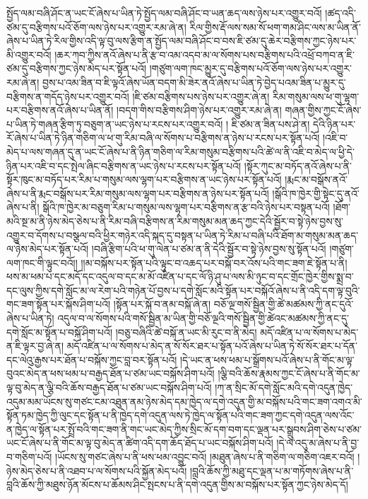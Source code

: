སྤྱོད་ལམ་བཞི་ཤོང་ན་ཡང་ངོ་ཞེས་པ་ཡིན་ཏེ་སྤྱོད་ལམ་བཞི་ཤོང་བ་ཡན་ཆད་ལས་ཉེས་པར་འགྱུར་བའོ། །ཚད་འདི་ཙམ་དུ་བརྩིགས་པའོ་ཅོག་ལས་ཉེས་པར་འགྱུར་རམ་ཞེ་ན། རིལ་གྱིས་རྡོ་ལས་སམ་སོ་ཕག་གམ་ཤིང་ལས་མ་ཡིན་ནོ་ཞེས་པ་ཡིན་ཏེ་རིལ་གྱིས་འདི་ལྟ་བུ་ལས་རྩིག་ན་སྤྱོད་ལམ་བཞི་ཤོང་བ་བས་ཇི་ཙམ་དུ་ཆེར་བརྩིགས་ཀྱང་ཉེས་པར་མི་འགྱུར་བའོ། །ཆར་ཀབ་ཀྱིས་ནའོ་ཞེས་པ་ནི་རྩ་བ་འམ་འདབ་མ་ལ་སོགས་པས་བརྩིགས་པའི་འཕྲོ་བཀབ་ན་ཇི་ཙམ་དུ་བརྩིགས་ཀྱང་ཉེས་མེད་པར་སྟོན་པའོ། །གཙུག་ལག་ཁང་མྱུར་དུ་བརྩིགས་པའོ་ཅོག་ལས་ཉེས་པར་འགྱུར་རམ་ཞེ་ན། བྱས་པ་འམ་ཟིན་བ་ཇི་ལྟའོ་ཞེས་ཡོན་བདག་མི་ཟེར་ནའོ་ཞེས་པ་ཡིན་ཏེ་བྱེད་པའམ་ཟིན་པ་མྱུར་དུ་བརྩིགས་ན་གདོད་ཉེས་པར་འགྱུར་བའོ། །ཇི་ཙམ་བརྩིགས་པས་ཉེས་པར་འགྱུར་ཞེ་ན། རིམ་གསུམ་ལས་ཕ་གུ་ལྷག་པར་བརྩིགས་ནའོ་ཞེས་པ་ཡིན་ནོ། །བདག་གིས་བརྩིགས་ཤིག་ཉེས་པར་འགྱུར་རམ་ཞེ་ན། གཞན་གྱིས་ཀྱང་ངོ་ཞེས་པ་ཡིན་ཏེ་གཞན་རྩིག་ཏུ་བཅུག་ན་ཡང་ཉེས་པ་རངས་པར་འགྱུར་བའོ། །
ཇི་ཙམ་ན་ཟིན་པས་ཤེ་ན། དེའི་ཉིན་པར་རོ་ཞེས་པ་ཡིན་ཏེ་ཉིན་གཅིག་ལ་ཕ་གུ་རིམ་བཞི་ལ་སོགས་པ་བརྩིགས་ན་ཉེས་པ་རངས་པར་སྟོན་པའོ། །འཇི་བ་མེད་པ་ལས་གཞན་དུ་ན་ཡང་ངོ་ཞེས་པ་ནི་ཉིན་གཅིག་ལ་རིམ་གསུམ་བརྩིགས་པའི་ཚེ་ལ་ནི་འཇི་བ་མེད་ལ་ཕྱི་དེ་ཉིན་པར་འཇི་བ་དང་སྤེལ་ཞིང་བརྩིགས་ན་ཡང་ཉེས་པ་རངས་པར་སྟོན་པའོ། །སྟོར་ཀུང་མ་བཏོད་ནའོ་ཞེས་པ་ནི་སྟོར་ཁུང་མ་བཏོད་པར་རིམ་པ་གསུམ་ལས་ལྷག་པར་བརྩིགས་ན་ཡང་ཉེས་པར་སྟོན་པའོ། །རྨང་མ་བསྒོས་ནའོ་ཞེས་པ་ནི་རྨང་བསྒོས་པར་རིམ་གསུམ་ལས་ལྷག་པར་བརྩིགས་ན་ཉེས་པར་སྟོན་པའོ། །སྒོའི་ཁ་ཁྱེར་གྱི་སྟེང་དུ་ནའོ་ཞེས་པ་ནི། སྒོའི་ཁ་ཁྱེར་མ་བཅུག་རིམ་པ་གསུམ་ལས་ལྷག་པར་བརྩིགས་ན་རྩ་བའི་ཉེས་པར་བསྟན་པའོ། །ཐོག་མའི་སྔ་མ་ནི་ཉེས་མེད་ཅེས་པ་ནི་རིམ་བཞི་བརྩིགས་ན་རིམ་གསུམ་མན་ཆད་ཀྱང་དེའི་སྦྱོར་བ་སྟེ་ཉེས་བྱས་སུ་འགྱུར་བ་དོགས་པ་བསྩལ་བའི་ཕྱིར་གཉེར་འདི་སྐད་དུ་བསྟན་པ་ཡིན་ཏེ་རིམ་པ་བཞི་པའི་ཐོག་མ་གསུམ་མན་ཆད་ལ་ཉེས་མེད་པར་སྟོན་པའོ། །བཞི་རྩིག་པའི་ཕ་གུ་ལེན་པ་ཙམ་ན་ནི་དེའི་སྦྱོར་བ་སྟེ་ཉེས་བྱས་སུ་སྟོན་པའོ། །གཙུག་ལག་ཁང་གི་ལྟུང་བའོ།། །།མ་བསྐོས་པར་སྟོན་པའི་ལྟུང་བ་འཆད་པར་བསྐོ་བར་འོས་པའི་གང་ཟག་ཇེ་སྟོན་པ་ནི། ཕས་མ་ཕམ་པ་དང་མདོ་དང་འདུལ་བ་དང་མ་མོ་འཛིན་པ་དང་ལོ་ཉི་ཤུ་པ་ལས་མི་ཉུང་བ་དང་གྲོང་ཁྱེར་གྱིས་སྨྲ་བ་དང་ལུས་ཀྱིས་དགེ་སློང་མ་ལ་རེག་པའི་གཉེན་པོ་བྱས་པ་དགེ་སློང་མའི་སྟོན་པར་བསྐོའོ་ཞེས་པ་ནི་འདི་དག་ལྟ་བུའི་གང་ཟག་སྟོན་པར་སྐོས་ཤིག་པའོ། །སྟོན་པར་སྐོ་བ་ནམ་བསྐོ་ཞེ་ན། བཅོ་ལྔ་གསོ་སྦྱིན་གྱི་ཚེ་མཚམས་ཀྱི་ནང་དུའོ་ཞེས་པ་ཡིན་ཏེ། འདུལ་བ་ལ་སོགས་པའི་གསོ་སྦྱིན་མ་ཡིན་གྱི་བཅོ་ལྔའི་གསོ་སྦྱིན་གྱི་ཚེའང་མཚམས་ཀྱི་ནང་དུ་དགེ་སློང་མ་སྟོན་པ་བསྐོ་ཤིག་པའོ། །བཅུ་བཞིའི་ཚེ་བསྐོ་ན་ཡང་མི་རུང་བ་ནི་མེད། མདོ་འཛིན་པ་ལ་སོགས་པ་མེད་ན་ཇི་ལྟར་བྱ་ཞེ་ན། མདོ་འཛིན་པ་ལ་སོགས་པ་མེད་ན་སོ་སོར་ཐར་པ་སྟོན་པའོ་ཞེས་པ་ཡིན་ཏེ་སོ་སོར་ཐར་པ་དོན་དང་ལེའུ་རྒྱས་པར་ཐོན་པ་བསྐོས་ཀྱང་བླ་བར་སྟོན་པའོ། །དེ་ཡང་ན་ཕས་ཕམ་པ་སྒྲོགས་པའོ་ཞེས་པ་ནི་གོང་མ་ལྟ་བུའང་མེད་ན་ཕས་ཕམ་པ་བརྒྱད་ཐོན་པ་ཙམ་ཡང་བསྐོས་ཤིག་པའོ། །ལྕི་བའི་ཆོས་རྣམས་ཀྱང་ངོ་ཞེས་པ་ནི་གོང་མ་ལྟ་བུ་མེད་ན་ལྕི་བའི་ཆོས་བརྒྱད་ཐོན་པ་ཙམ་ཡང་བསྐོས་ཤིག་པའོ། །ཀ་ན་སྲིང་མོ་དགེ་སློང་མའི་དགེ་འདུན་ཁྱེད་འདུམ་མམ་ཡོངས་སུ་གཙང་ངམ་འཐུན་ནམ་ཉེས་མེད་དམ་ཁྱེད་ལ་དགེ་འདུན་གྱི་མ་བསྐོས་པའི་གང་ཟག་འགའ་མི་སྟོན་ཏམ་ཁྱེད་ཀྱི་ལུང་དང་སྟོན་པ་ནི་ཁྱེད་དགེ་འདུན་ལས་ཏེ་ཁྱེད་ལ་སྟོན་པའི་གང་ཟག་ཀྱང་དགེ་འདུན་ལས་འོང་ན་ཁྱེད་ལ་སྟོན་པར་སྤྲོ་བའི་གང་ཟག་ནི་གང་ཡང་མེད་ཀྱིས་སྲིང་མོ་དག་བག་དང་ལྡན་པར་སྒྲུབས་ཤིག་ཅེས་པ་ཙམ་ཡང་ངོ་ཞེས་པ་ནི་གོང་མ་ལྟ་བུ་མེད་ན་ཚིག་འདི་དག་ཆོད་ཐོད་པ་ཡང་བསྐོས་ཤིག་པའོ། །དེ་ལ་འདུ་མ་ཞེས་པ་ནི་བྱ་བ་གཅིག་པའོ། །ཡོངས་སུ་གཙང་ཞེས་པ་ནི་ཕས་ཕམ་འབྱུང་བའོ། །མཐུན་ཞེས་པ་ནི་གཅིག་ལ་གཅིག་འཇར་བའོ། །ཉེས་མེད་ཅེས་པ་ནི་འཐབ་པ་ལ་སོགས་པའི་སྐྱོན་མེད་པའོ། །བླའི་ཆོས་ཀྱི་མཐུ་དང་ལྡན་པ་མ་གཏོགས་ཞེས་པ་ནི་བླའི་ཆོས་ཀྱི་མཐུས་ཉོན་མོངས་པ་ཆོམས་ཤིང་སྤངས་པ་ནི་དགེ་འདུན་གྱིས་མ་བསྐོས་པར་སྟོན་ཀྱང་ཉེས་མེད་དོ། 